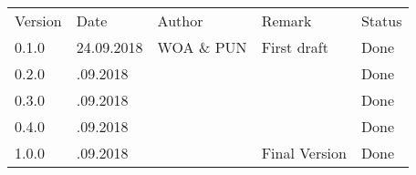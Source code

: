 \newcolumntype{b}{X}

\begingroup
   \setlength{\tabcolsep}{10pt} %
   \renewcommand{\arraystretch}{1.5} %
   \begin{table}[H]
      \begin{tabularx}{\textwidth}{sssbs}
         Version & Date 	    & Author		    & Remark        			& Status \\%
         0.1.0   & 24.09.2018   & WOA \& PUN	& First draft		            & Done   \\ 
         0.2.0   & .09.2018     & 	        &                               	& Done   \\ \cline{1-5}
         0.3.0   & .09.2018     & 	        &                                   & Done   \\ 
         0.4.0   & .09.2018     & 	        &                                   & Done   \\ 
         1.0.0   & .09.2018     & 	        & Final Version                     & Done   \\ 
      \end{tabularx}
   \end{table}
\endgroup
